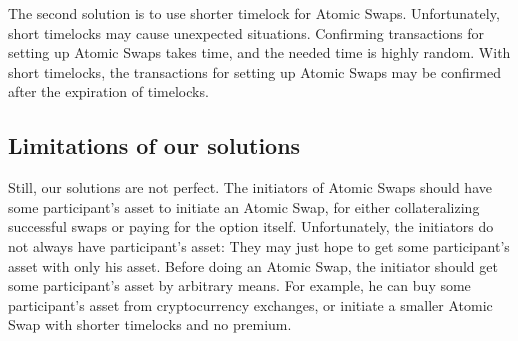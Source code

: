The second solution is to use shorter timelock for Atomic Swaps.
Unfortunately, short timelocks may cause unexpected situations.
Confirming transactions for setting up Atomic Swaps takes time, and the needed time is highly random.
With short timelocks, the transactions for setting up Atomic Swaps may be confirmed after the expiration of timelocks.


\subsection{Limitations of our solutions}

Still, our solutions are not perfect.
The initiators of Atomic Swaps should have some participant's asset to initiate an Atomic Swap,
for either collateralizing successful swaps or paying for the option itself.
Unfortunately, the initiators do not always have participant's asset: They may just hope to get some participant's asset with only his asset.
Before doing an Atomic Swap, the initiator should get some participant's asset by arbitrary means.
For example, he can buy some participant's asset from cryptocurrency exchanges, or initiate a smaller Atomic Swap with shorter timelocks and no premium.